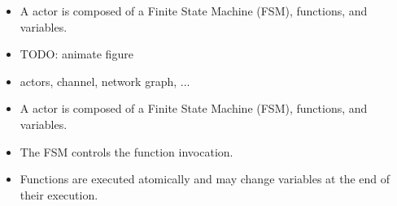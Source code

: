 \begin{frame}[t]
\begin{figure}
\centering
\resizebox{0.4\columnwidth}{!}{}
\end{figure}
\begin{itemize}
\item A \SysteMoC{} actor is composed of a Finite State Machine (FSM), functions, and variables.
\end{itemize}
\end{frame}







\begin{frame}
\begin{itemize}
\item TODO: animate figure
\item actors, channel, network graph, ...
\end{itemize}
\end{frame}





\begin{frame}
\begin{figure}
\centering
\resizebox{0.7\columnwidth}{!}{}
\end{figure}
\begin{itemize}
\item A \SysteMoC{} actor is composed of a Finite State Machine (FSM), functions, and variables.
\item The FSM controls the function invocation.
\item Functions are executed atomically and may change variables at the end of their execution.
\end{itemize}
\end{frame}


